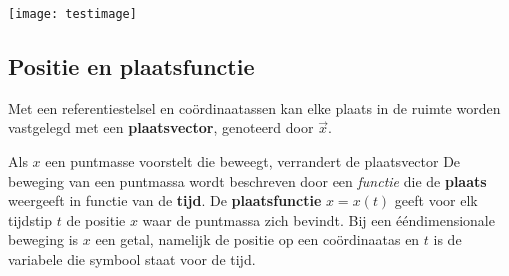 \documentclass{ximera}
\begin{document}
	\author{Bart Lambregs}

	\begin{image}
	\texttt{[image: testimage]}
\end{image}
    \xmsource\xmuitleg







\subsection*{Positie en plaatsfunctie}

Met een referentiestelsel en coördinaatassen kan elke plaats in de ruimte worden vastgelegd met een \textbf{plaatsvector}, genoteerd door \(\vec{x}\).  

\begin{image}
\end{image}
  

Als \(x\) een puntmasse voorstelt die beweegt, verrandert de plaatsvector   
De beweging van een puntmassa wordt beschreven door een \textit{functie} die de \textbf{plaats} weergeeft in functie van de \textbf{tijd}. 
De \textbf{plaatsfunctie} $x = x(t)$ geeft voor elk tijdstip \(t\) de positie \(x\) waar de puntmassa zich bevindt. 
Bij een ééndimensionale beweging is $x$ een getal, namelijk de positie op een coördinaatas
en $t$ is de variabele die symbool staat voor de tijd.
\end{document}
